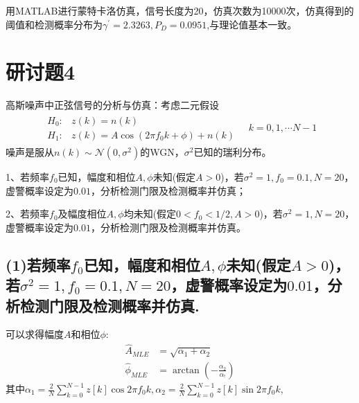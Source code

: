 \documentclass[fontset=windows]{article}
\numberwithin{figure}{section}
\begin{document}
用MATLAB进行蒙特卡洛仿真，信号长度为20，仿真次数为10000次，仿真得到的阈值和检测概率分布为\(\gamma^{\prime}=2.3263,P_D=0.0951\),与理论值基本一致。

\section{研讨题4}

高斯噪声中正弦信号的分析与仿真：考虑二元假设
\begin{align*}
    \begin{matrix}
        H_0: & z(k)=n(k)                        \\
        H_1: & z(k)=A\cos(2\pi f_0 k+\phi)+n(k)
    \end{matrix}\quad k=0,1,\cdots N-1
\end{align*}
噪声是服从\(n(k)\sim \mathcal{N}(0,\sigma^2)\)的WGN，\(\sigma^2\)已知的瑞利分布。

1、若频率\(f_0\)已知，幅度和相位\(A,\phi\)未知(假定\(A>0\))，若\(\sigma^2=1,f_0=0.1,N=20\)，虚警概率设定为\(0.01\)，分析检测门限及检测概率并仿真；

2、若频率\(f_0\)及幅度相位\(A,\phi \)均未知(假定\(0<f_0<1/2,A>0\))，若\(\sigma^2=1,N=20\)，虚警概率设定为\(0.01\)，分析检测门限及检测概率并仿真。

\subsection*{(1)若频率\(f_0\)已知，幅度和相位\(A,\phi\)未知(假定\(A>0\))，若\(\sigma^2=1,f_0=0.1,N=20\)，虚警概率设定为\(0.01\)，分析检测门限及检测概率并仿真.}

可以求得幅度\(A\)和相位\(\phi\):
\begin{align*}
    \hat{A}_{MLE}    & =\sqrt{\alpha_1+\alpha_2}            \\
    \hat{\phi}_{MLE} & =\arctan(-\frac{\alpha_2}{\alpha_!})
\end{align*}
其中\(\alpha_1=\frac{2}{N}\sum_{k=0}^{N-1}z[k]\cos 2\pi f_0 k,\alpha_2=\frac{2}{N}\sum_{k=0}^{N-1}z[k]\sin 2\pi f_0 k\),
\end{document}
